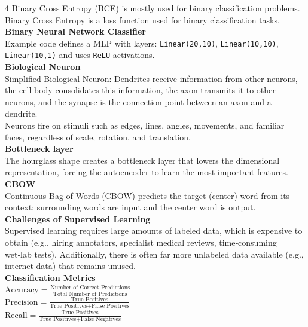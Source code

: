 \documentclass[8pt]{extarticle}
\begin{document}
\begin{multicols}{4}
Binary Cross Entropy (BCE) is mostly used for binary classification problems.\\
Binary Cross Entropy is a loss function used for binary classification tasks.\\
\vspace{2pt}\textbf{Binary Neural Network Classifier}\\
Example code defines a MLP with layers: \texttt{Linear(20,10)}, \texttt{Linear(10,10)}, \texttt{Linear(10,1)} and uses \texttt{ReLU} activations.\\
\vspace{2pt}\textbf{Biological Neuron}\\
Simplified Biological Neuron: Dendrites receive information from other neurons, the cell body consolidates this information, the axon transmits it to other neurons, and the synapse is the connection point between an axon and a dendrite.\\
Neurons fire on stimuli such as edges, lines, angles, movements, and familiar faces, regardless of scale, rotation, and translation.\\
\vspace{2pt}\textbf{Bottleneck layer}\\
The hourglass shape creates a bottleneck layer that lowers the dimensional representation, forcing the autoencoder to learn the most important features.\\
\vspace{2pt}\textbf{CBOW}\\
Continuous Bag‑of‑Words (CBOW) predicts the target (center) word from its context; surrounding words are input and the center word is output.\\
\vspace{2pt}\textbf{Challenges of Supervised Learning}\\
Supervised learning requires large amounts of labeled data, which is expensive to obtain (e.g., hiring annotators, specialist medical reviews, time‑consuming wet‑lab tests). Additionally, there is often far more unlabeled data available (e.g., internet data) that remains unused.\\
\vspace{2pt}\textbf{Classification Metrics}\\
$ \text{Accuracy} = \frac{\text{Number of Correct Predictions}}{\text{Total Number of Predictions}} $\\
$ \text{Precision} = \frac{\text{True Positives}}{\text{True Positives} + \text{False Positives}} $\\
$ \text{Recall} = \frac{\text{True Positives}}{\text{True Positives} + \text{False Negatives}} $\\


\end{multicols}
\end{document}
